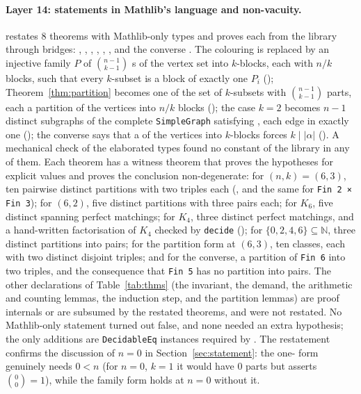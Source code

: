 \documentclass[11pt]{article}
\theoremstyle{definition}
\theoremstyle{remark}
\newcommand{\lean}[1]{\texttt{#1}}
\newcommand{\NN}{\mathbb{N}}
\begin{document}
\paragraph{Layer 14: statements in Mathlib's language and non-vacuity.} 
restates 8 theorems with Mathlib-only types and proves each from the library through bridges:
, , , ,
, , 
and the converse . The colouring is replaced by an injective
family $P$ of $\binom{n-1}{k-1}$ s of the vertex set into $k$-blocks, each with
$n/k$ blocks, such that every $k$-subset is a block of exactly one $P_i$ ();
Theorem~\ref{thm:partition} becomes one  of the set of $k$-subsets with
$\binom{n-1}{k-1}$ parts, each a partition of the vertices into $n/k$ blocks
(); the case $k=2$ becomes $n-1$ distinct subgraphs of the complete
\lean{SimpleGraph} satisfying , each edge in exactly
one (); the converse says that a  of
the vertices into $k$-blocks forces $k\mid|\alpha|$ (). A
mechanical check of the elaborated types found no constant of the library in any of them. Each
theorem has a witness theorem that proves the hypotheses for explicit values and proves the
conclusion non-degenerate: for $(n,k)=(6,3)$, ten pairwise distinct partitions with two triples each
(, and the same for \lean{Fin 2 × Fin 3}); for $(6,2)$, five distinct partitions
with three pairs each; for $K_6$, five distinct spanning perfect matchings; for $K_4$, three distinct
perfect matchings, and a hand-written factorisation of $K_4$ checked by \lean{decide}
(); for $\{0,2,4,6\}\subseteq\NN$, three distinct partitions into
pairs; for the partition form at $(6,3)$, ten classes, each with two distinct disjoint triples; and
for the converse, a partition of \lean{Fin 6} into two triples, and the consequence that \lean{Fin 5}
has no partition into pairs. The other declarations of Table~\ref{tab:thms} (the invariant, the
demand, the arithmetic and counting lemmas, the induction step, 
and the partition lemmas) are proof internals or are subsumed by the restated theorems, and were not
restated. No Mathlib-only statement turned out false, and none needed an extra hypothesis; the only
additions are \lean{DecidableEq} instances required by . The restatement
confirms the discussion of $n=0$ in Section~\ref{sec:statement}: the one- form
genuinely needs $0<n$ (for $n=0$, $k=1$ it would have $0$ parts but asserts $\binom{0}{0}=1$), while
the family form  holds at $n=0$ without it.
\end{document}
